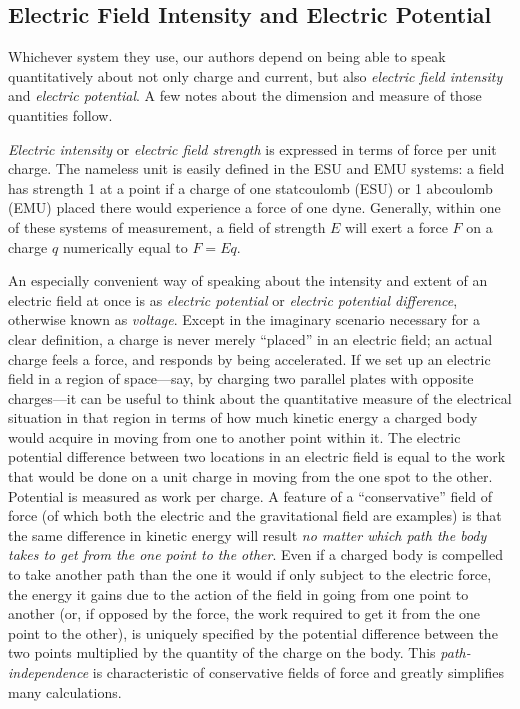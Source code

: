 \subsection*{Electric Field Intensity and Electric Potential}\label{ch_sec:appendix}

Whichever system they use, our authors depend on being able to speak
quantitatively about not only charge and current, but also \emph{electric field
intensity} and \emph{electric potential}. A few notes about the dimension
and measure of those quantities follow.

\emph{Electric intensity} or \emph{electric field strength} is expressed
in terms of force per unit charge. The nameless unit is easily defined in the
ESU and EMU systems: a field has strength 1 at a point if a charge of one
statcoulomb (ESU) or 1 abcoulomb (EMU) placed there would experience a force 
of one dyne. Generally, within one of these systems of measurement, a field of 
strength $E$ will exert a force $F$ on a charge $q$ numerically equal to $F = Eq$.

An especially convenient way of speaking about the intensity and extent of
an electric field at once is as \emph{electric potential} or \emph{electric 
potential difference}, otherwise known as \emph{voltage}. Except in the imaginary scenario
necessary for a clear definition, a charge is never merely ``placed'' in an electric
field; an actual charge feels a force, and responds by being accelerated. If we set up an
electric field in a region of space---say, by charging two parallel plates
with opposite charges---it can be useful to think about the quantitative
measure of the electrical situation in that region in terms of how much kinetic energy a 
charged body would acquire in moving from one to another point within it. The electric potential
difference between two locations in an electric field is equal to the work that
would be done on a unit charge in moving from the one spot to the other. Potential
is measured as work per charge. A feature of a ``conservative'' field of force 
(of which both the electric and the gravitational field are examples) is that
the same difference in kinetic energy will result \emph{no matter which path the
body takes to get from the one point to the other}. Even if a charged body is compelled
to take another path than the one it would if only subject to the electric force, the energy 
it gains due to the action of the field in going from one point to another (or, if opposed
by the force, the work required to get it from the one point to the other),
is uniquely specified by the potential difference between the two points multiplied by the 
quantity of the charge on the body.
This \emph{path-independence} is characteristic of conservative fields of force and
greatly simplifies many calculations.

